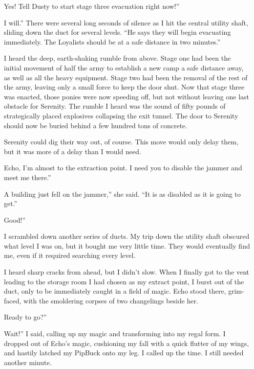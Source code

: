\leavevmode{}Yes! Tell Dusty to start stage three evacuation right now!”

\leavevmode{}I will.” There were several long seconds of silence as I hit the central utility shaft, sliding down the duct for several levels. “He says they will begin evacuating immediately. The Loyalists should be at a safe distance in two minutes.”

I heard the deep, earth-shaking rumble from above. Stage one had been the initial movement of half the army to establish a new camp a safe distance away, as well as all the heavy equipment. Stage two had been the removal of the rest of the army, leaving only a small force to keep the door shut. Now that stage three was enacted, those ponies were now speeding off, but not without leaving one last obstacle for Serenity. The rumble I heard was the sound of fifty pounds of strategically placed explosives collapsing the exit tunnel. The door to Serenity should now be buried behind a few hundred tons of concrete.

Serenity could dig their way out, of course. This move would only delay them, but it was more of a delay than I would need.

\leavevmode{}Echo, I’m almost to the extraction point. I need you to disable the jammer and meet me there.”

\leavevmode{}A building just fell on the jammer,” she said. “It is as disabled as it is going to get.”

\leavevmode{}Good!”

I scrambled down another series of ducts. My trip down the utility shaft obscured what level I was on, but it bought me very little time. They would eventually find me, even if it required searching every level.

I heard sharp cracks from ahead, but I didn’t slow. When I finally got to the vent leading to the storage room I had chosen as my extract point, I burst out of the duct, only to be immediately caught in a field of magic. Echo stood there, grim-faced, with the smoldering corpses of two changelings beside her.

\leavevmode{}Ready to go?”

\leavevmode{}Wait!” I said, calling up my magic and transforming into my regal form. I dropped out of Echo’s magic, cushioning my fall with a quick flutter of my wings, and hastily latched my PipBuck onto my leg. I called up the time. I still needed another minute.

